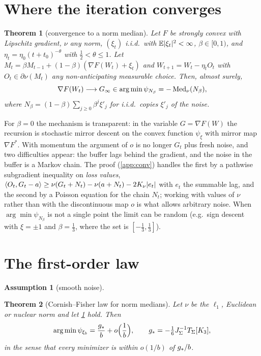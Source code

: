 \documentclass{article}
\theoremstyle{plain}
\newtheorem{theorem}{Theorem}
\theoremstyle{definition}
\newtheorem{assumption}{Assumption}
\theoremstyle{remark}
\begin{document}
\section{Where the iteration converges}\label{sec:conv}

\begin{theorem}[convergence to a norm median]\label{thm:conv}
Let $F$ be strongly convex with Lipschitz gradient, $\nu$ any norm, $(\xi_t)$ i.i.d.\ with $\mathbb{E}|\xi_t|^2<\infty$,
$\beta\in[0,1)$, and $\eta_t=\eta_0(t+t_0)^{-\theta}$ with $\frac12<\theta\le1$. Let
$M_t=\beta M_{t-1}+(1-\beta)(\nabla F(W_t)+\xi_t)$ and $W_{t+1}=W_t-\eta_tO_t$ with $O_t\in\partial\nu(M_t)$ any
non-anticipating measurable choice. Then, almost surely,
\[
\nabla F(W_t)\longrightarrow G_\infty\in\arg\min\psi_{N_\beta}=-\operatorname{Med}_\nu(N_\beta),
\]
where $N_\beta=(1-\beta)\sum_{j\ge0}\beta^j\xi'_j$ for i.i.d.\ copies $\xi'_j$ of the noise.
\end{theorem}

For $\beta=0$ the mechanism is transparent: in the variable $G=\nabla F(W)$ the recursion is stochastic mirror
descent on the convex function $\psi_\xi$ with mirror map $\nabla F^\ast$. With momentum the argument of $o$ is no
longer $G_t$ plus fresh noise, and two difficulties appear: the buffer lags behind the gradient, and the noise in
the buffer is a Markov chain. The proof (\cref{app:conv}) handles the first by a pathwise subgradient inequality on
\emph{loss values}, $\langle O_t, G_t-a\rangle\ge\nu(G_t+N_t)-\nu(a+N_t)-2K_\nu|e_t|$ with $e_t$ the summable lag, and the second
by a Poisson equation for the chain $N_t$; working with values of $\nu$ rather than with the discontinuous map $o$ is
what allows arbitrary noise. When $\arg\min\psi_{N_\beta}$ is not a single point the limit can be random (e.g.\ sign
descent with $\xi=\pm1$ and $\beta=\frac13$, where the set is $[-\frac13,\frac13]$).

\section{The first-order law}\label{sec:law}

\begin{assumption}[smooth noise]\label{ass:N}\StmtAssN\end{assumption}

\begin{theorem}[Cornish--Fisher law for norm medians]\label{thm:cf}
Let $\nu$ be the $\ell_1$, Euclidean or nuclear norm and let \cref{ass:N} hold. Then
\begin{equation}\label{eq:cf-main}
\arg\min\psi_{\xi_b}=\frac{g_\ast}b+o\Big(\frac1b\Big),\qquad g_\ast=-\tfrac16J_\Sigma^{-1}T_\Sigma[K_3],
\end{equation}
in the sense that every minimizer is within $o(1/b)$ of $g_\ast/b$.
\end{theorem}
\end{document}
